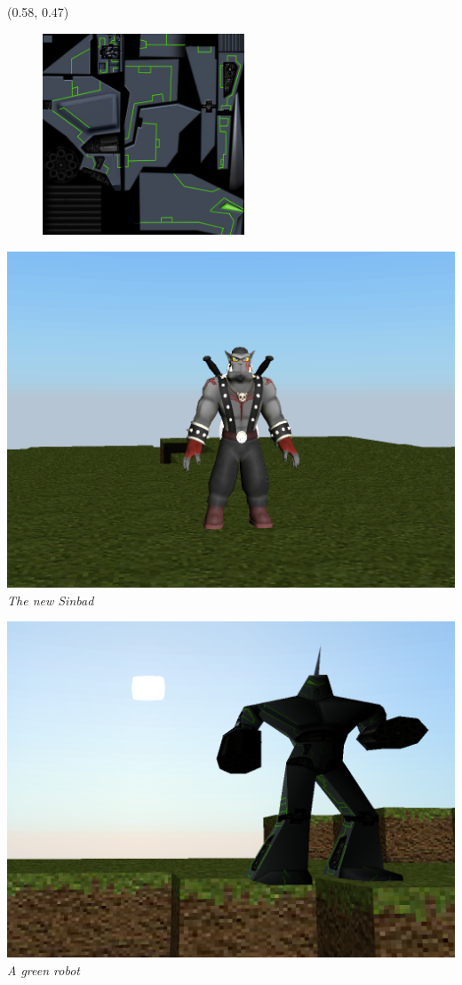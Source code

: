 \documentclass[article]{report}             %
\begin{document}
				\begin{textblock}{0.628}(0.58, 0.47)
					\begin{figure}
						\includegraphics[width=6cm]{images/r2skin_T.jpg}
					\end{figure}
				\end{textblock}
				
				\newpage
				
				
				\begin{center}
				\includegraphics[width=14.5cm]{images/newSinbad.png}\\
				\it The new Sinbad
				
				\includegraphics[width=14.5cm]{images/greenRobot.png}\\
				\it A green robot
				\end{center}
				
\end{document}
